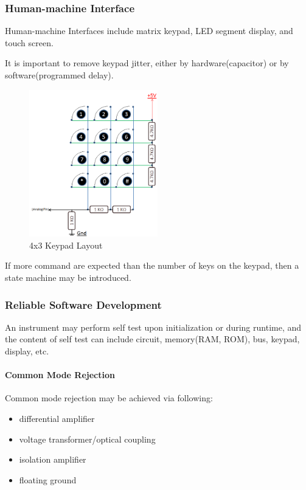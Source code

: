 \subsubsection{Human-machine Interface}

Human-machine Interfaces include matrix keypad, LED segment display, and touch screen.

It is important to remove keypad jitter, either by hardware(capacitor) or by software(programmed delay).

\begin{figure}
  \centering
  \includegraphics[width=2.2in]{fig/4x3_KeypadLayout.png}
  \caption{4x3 Keypad Layout}\label{fig_keypad}
\end{figure}

If more command are expected than the number of keys on the keypad, then a state machine may be introduced.

\subsubsection{Reliable Software Development}

An instrument may perform self test upon initialization or during runtime, and the content of self test can include circuit, memory(RAM, ROM), bus, keypad, display, etc.

\paragraph{Common Mode Rejection} Common mode rejection may be achieved via following:

\begin{itemize}
  \item differential amplifier
  \item voltage transformer/optical coupling
  \item isolation amplifier
  \item floating ground
\end{itemize}

